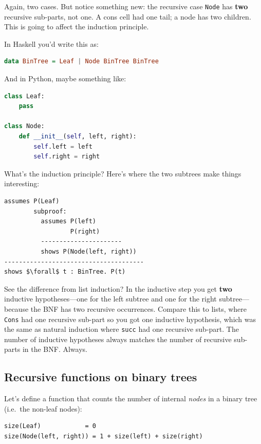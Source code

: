\documentclass[11pt]{article}
\begin{document}
\noindent Again, two cases. But notice something new: the recursive case \texttt{Node} has \textbf{two} recursive sub-parts, not one. A cons cell had one tail; a node has two children. This is going to affect the induction principle.

In Haskell you'd write this as:
\begin{lstlisting}[language=Haskell]
data BinTree = Leaf | Node BinTree BinTree
\end{lstlisting}

And in Python, maybe something like:
\begin{lstlisting}[language=Python]
class Leaf:
    pass

class Node:
    def __init__(self, left, right):
        self.left = left
        self.right = right
\end{lstlisting}

What's the induction principle? Here's where the two subtrees make things interesting:

\begin{lstlisting}
assumes P(Leaf)
        subproof:
          assumes P(left)
                  P(right)
          ----------------------
          shows P(Node(left, right))
--------------------------------------
shows $\forall$ t : BinTree. P(t)
\end{lstlisting}

See the difference from list induction? In the inductive step you get \textbf{two} inductive hypotheses---one for the left subtree and one for the right subtree---because the BNF has two recursive occurrences. Compare this to lists, where \texttt{Cons} had one recursive sub-part so you got one inductive hypothesis, which was the same as natural induction where \texttt{succ} had one recursive sub-part. The number of inductive hypotheses always matches the number of recursive sub-parts in the BNF. Always.

\subsection{Recursive functions on binary trees}

Let's define a function that counts the number of internal \emph{nodes} in a binary tree (i.e.\ the non-leaf nodes):

\begin{lstlisting}
size(Leaf)            = 0
size(Node(left, right)) = 1 + size(left) + size(right)
\end{lstlisting}
\end{document}

